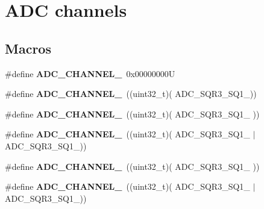 \hypertarget{group___a_d_c__channels}{}\section{A\+DC channels}
\label{group___a_d_c__channels}
\subsection*{Macros}
\begin{DoxyCompactItemize}
\item 
\mbox{\label{group___a_d_c__channels_ga3c5075aee5af4eae02f1a72d6216199c}} 
\#define {\bfseries A\+D\+C\+\_\+\+C\+H\+A\+N\+N\+E\+L\+\_}~0x00000000U
\item 
\mbox{\label{group___a_d_c__channels_gaeb119201733a871c94971c51843ffaac}} 
\#define {\bfseries A\+D\+C\+\_\+\+C\+H\+A\+N\+N\+E\+L\+\_}~((uint32\+\_\+t)(                                                                    A\+D\+C\+\_\+\+S\+Q\+R3\+\_\+\+S\+Q1\+\_))
\item 
\mbox{\label{group___a_d_c__channels_gad576132ebd78a3429be34f44e474c914}} 
\#define {\bfseries A\+D\+C\+\_\+\+C\+H\+A\+N\+N\+E\+L\+\_}~((uint32\+\_\+t)(                                                   A\+D\+C\+\_\+\+S\+Q\+R3\+\_\+\+S\+Q1\+\_                 ))
\item 
\mbox{\label{group___a_d_c__channels_ga56dba5d35f1f7bcad41e4f9a7da3b125}} 
\#define {\bfseries A\+D\+C\+\_\+\+C\+H\+A\+N\+N\+E\+L\+\_}~((uint32\+\_\+t)(                                                   A\+D\+C\+\_\+\+S\+Q\+R3\+\_\+\+S\+Q1\+\_ $\vert$ A\+D\+C\+\_\+\+S\+Q\+R3\+\_\+\+S\+Q1\+\_))
\item 
\mbox{\label{group___a_d_c__channels_ga66f19737ad81a0a62eb97854d0e41a54}} 
\#define {\bfseries A\+D\+C\+\_\+\+C\+H\+A\+N\+N\+E\+L\+\_}~((uint32\+\_\+t)(                                  A\+D\+C\+\_\+\+S\+Q\+R3\+\_\+\+S\+Q1\+\_                                  ))
\item 
\mbox{\label{group___a_d_c__channels_ga716f2836f655c753c629de439ce50ecf}} 
\#define {\bfseries A\+D\+C\+\_\+\+C\+H\+A\+N\+N\+E\+L\+\_}~((uint32\+\_\+t)(                                  A\+D\+C\+\_\+\+S\+Q\+R3\+\_\+\+S\+Q1\+\_                  $\vert$ A\+D\+C\+\_\+\+S\+Q\+R3\+\_\+\+S\+Q1\+\_))

\end{DoxyCompactItemize}
